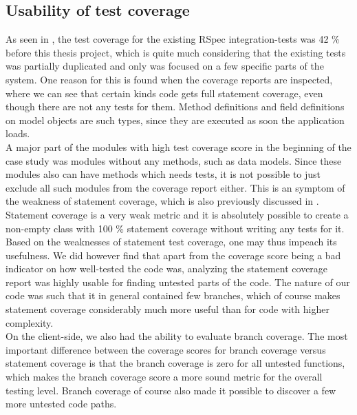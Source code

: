 
\subsection{Usability of test coverage}

As seen in , the test coverage for the
existing RSpec integration-tests was 42 \% before this thesis project,
which is quite much considering that the existing tests was partially
duplicated and only was focused on a few specific parts of the system.
One reason for this is found when the coverage reports are inspected,
where we can see that certain kinds code gets full statement coverage,
even though there are not any tests for them. Method definitions and
field definitions on model objects are such types, since they are
executed as soon the application loads.\\

A major part of the modules with high test coverage score in the
beginning of the case study was modules without any methods, such as
data models. Since these modules also can have methods which needs
tests, it is not possible to just exclude all such modules from the
coverage report either. This is an symptom of the weakness of statement
coverage, which is also previously discussed in
. Statement coverage is a very weak
metric and it is absolutely possible to create a non-empty class with
100 \% statement coverage without writing any tests for it.\\

Based on the weaknesses of statement test coverage, one may thus impeach
its usefulness. We did however find that apart from the coverage score
being a bad indicator on how well-tested the code was, analyzing the
statement coverage report was highly usable for finding untested parts
of the code. The nature of our code was such that it in general
contained few branches, which of course makes statement coverage
considerably much more useful than for code with higher complexity.\\

On the client-side, we also had the ability to evaluate branch coverage.
The most important difference between the coverage scores for branch
coverage versus statement coverage is that the branch coverage is zero
for all untested functions, which makes the branch coverage score a more
sound metric for the overall testing level. Branch coverage of course
also made it possible to discover a few more untested code paths.\\


